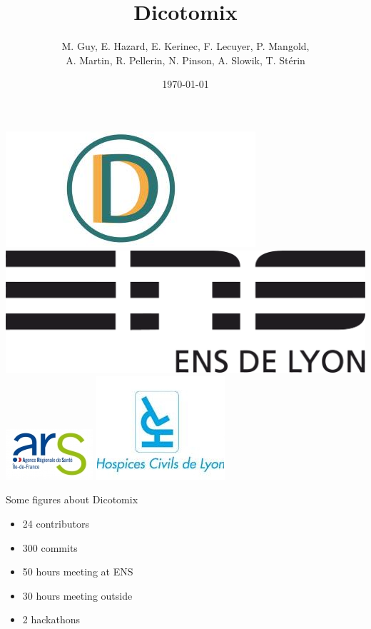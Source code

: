 \documentclass[graphics]{beamer}
\title[Title]{Dicotomix}
\author[T.S]{M. Guy, E. Hazard, E. Kerinec, F. Lecuyer, P. Mangold,\\ A. Martin, R. Pellerin, N. Pinson, A. Slowik, T. Stérin}
\date{\today}
\begin{document}
\begin{frame}
	\titlepage
	\begin{center}
		\includegraphics[scale=0.2]{dicotomix}
		\includegraphics[scale=0.08]{logoens}
		\hspace{2em}
		\includegraphics[scale=0.55]{ars}
		\hspace{2em}
		\includegraphics[scale=0.3]{hospices_civils_de_lyon}
	\end{center}
\end{frame}

\begin{frame}{Some figures about Dicotomix}
	\begin{itemize}
		\item 24 contributors
		\item 300 commits
		\item 50 hours meeting at ENS
		\item 30 hours meeting outside
		\item 2 hackathons
	\end{itemize}
\end{frame}
\end{document}
